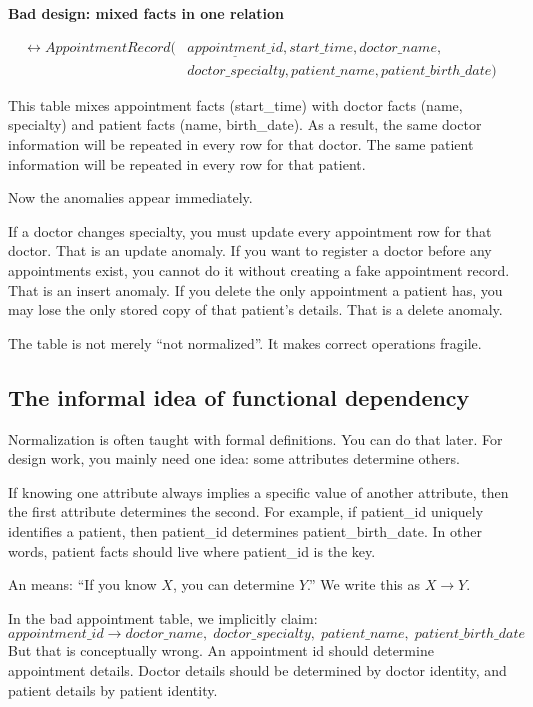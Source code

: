 \begin{examplebox}
\textbf{Bad design: mixed facts in one relation}\par\smallskip
\[
\begin{aligned}
\rel{AppointmentRecord}(&\underline{appointment\_id}, start\_time, doctor\_name, \\
&doctor\_specialty, patient\_name, patient\_birth\_date)
\end{aligned}
\]
\end{examplebox}

This table mixes appointment facts (start\_time) with doctor facts (name, specialty) and patient facts (name, birth\_date).
As a result, the same doctor information will be repeated in every row for that doctor.
The same patient information will be repeated in every row for that patient.

Now the anomalies appear immediately.

If a doctor changes specialty, you must update every appointment row for that doctor.
That is an update anomaly.
If you want to register a doctor before any appointments exist, you cannot do it without creating a fake appointment record.
That is an insert anomaly.
If you delete the only appointment a patient has, you may lose the only stored copy of that patient’s details.
That is a delete anomaly.

The table is not merely “not normalized”.
It makes correct operations fragile.

\subsection{The informal idea of functional dependency}
Normalization is often taught with formal definitions.
You can do that later.
For design work, you mainly need one idea: some attributes determine others.

If knowing one attribute always implies a specific value of another attribute, then the first attribute determines the second.
For example, if patient\_id uniquely identifies a patient, then patient\_id determines patient\_birth\_date.
In other words, patient facts should live where patient\_id is the key.

\begin{definitionbox}
An  means: “If you know \(X\), you can determine \(Y\).”
We write this as \(X \rightarrow Y\).
\end{definitionbox}

In the bad appointment table, we implicitly claim:
\[
appointment\_id \rightarrow doctor\_name,\; doctor\_specialty,\; patient\_name,\; patient\_birth\_date
\]
But that is conceptually wrong.
An appointment id should determine appointment details.
Doctor details should be determined by doctor identity, and patient details by patient identity.


